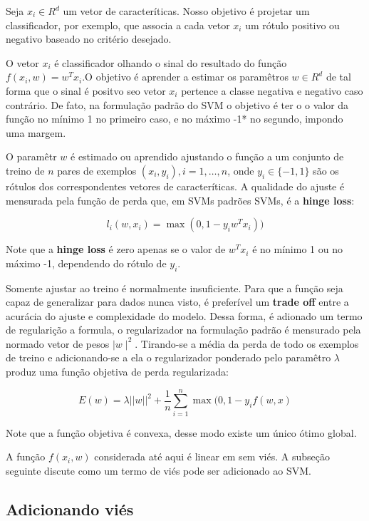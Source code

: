 \documentclass[]{article}
\begin{document}
Seja \(x_i \in R^d\) um vetor de caracteríticas. Nosso objetivo é
projetar um classificador, por exemplo, que associa a cada vetor \(x_i\)
um rótulo positivo ou negativo baseado no critério desejado.

O vetor \(x_i\) é classificador olhando o sinal do resultado do função
\(f(x_i,w) = w^Tx_i\).O objetivo é aprender a estimar os paramêtros
\(w \in R^d\) de tal forma que o sinal é positvo seo vetor \(x_i\)
pertence a classe negativa e negativo caso contrário. De fato, na
formulação padrão do SVM o objetivo é ter o o valor da função no mínimo
1 no primeiro caso, e no máximo -1* no segundo, impondo uma margem.

O paramêtr \(w\) é estimado ou aprendido ajustando o função a um
conjunto de treino de \(n\) pares de exemplos \((x_i,y_i),i=1,…,n\),
onde \(y_i \in \{-1,1\}\) são os rótulos dos correspondentes vetores de
caracteríticas. A qualidade do ajuste é mensurada pela função de perda
que, em SVMs padrões SVMs, é a \textbf{hinge loss}:

\begin{equation}
l_i(w,x_i)=\max(0,1-y_iw^Tx_i))
\end{equation}

Note que a \textbf{hinge loss} é zero apenas se o valor de \(w^Tx_i\) é
no mínimo 1 ou no máximo -1, dependendo do rótulo de \(y_i\).

Somente ajustar ao treino é normalmente insuficiente. Para que a função
seja capaz de generalizar para dados nunca visto, é preferível um
\textbf{trade off} entre a acurácia do ajuste e complexidade do modelo.
Dessa forma, é adionado um termo de regularição a formula, o
regularizador na formulação padrão é mensurado pela normado vetor de
pesos \(\mid w\mid^2\). Tirando-se a média da perda de todo os exemplos
de treino e adicionando-se a ela o regularizador ponderado pelo
paramêtro \(\lambda\) produz uma função objetiva de perda regularizada:

\begin{equation}
  E(w)  = \lambda||w||^2+\frac{1}{n} \sum_{i=1}^{n}\max(0,1-y_if(w,x)
\end{equation}

Note que a função objetiva é convexa, desse modo existe um único ótimo
global.

A função \(f(x_i,w)\) considerada até aqui é linear em sem viés. A
subseção seguinte discute como um termo de viés pode ser adicionado ao
SVM.

\subsection{Adicionando viés}\label{adicionando-vies}
\end{document}
